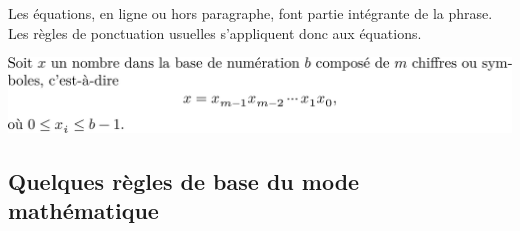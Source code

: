 \begin{conseil}
  Les équations, en ligne ou hors paragraphe, font partie intégrante
  de la phrase. Les règles de ponctuation usuelles s'appliquent donc
  aux équations.

  \fbox\includegraphics[width=0.95\linewidth]{ponctuation}
\end{conseil}

\subsection{Quelques règles de base du mode mathématique}


